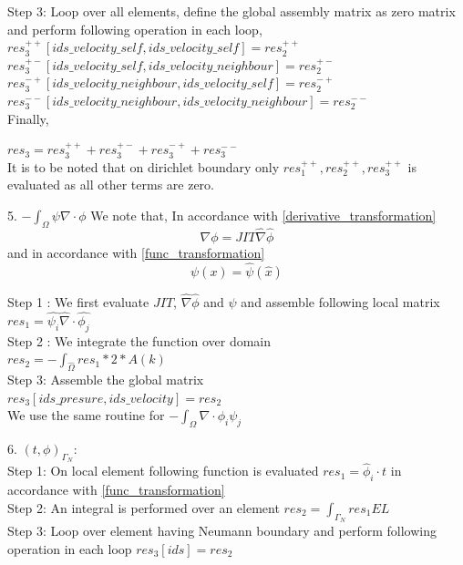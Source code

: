 \documentclass[a4paper,12pt]{book}
\begin{document}
Step 3: Loop over all elements, define the global assembly matrix as zero matrix and perform following operation in each loop,
\\
$res_3^{++}[ids\_velocity\_self,ids\_velocity\_self] = res_2^{++}$\\
$res_3^{+-}[ids\_velocity\_self,ids\_velocity\_neighbour] = res_2^{+-}$\\
$res_3^{-+}[ids\_velocity\_neighbour,ids\_velocity\_self] = res_2^{-+}$\\
$res_3^{--}[ids\_velocity\_neighbour,ids\_velocity\_neighbour] = res_2^{--}$\\

Finally,

$res_3 = res_3^{++} + res_3^{+-} + res_3^{-+} + res_3^{--}$\\

It is to be noted that on dirichlet boundary only $res_1^{++}, res_2^{++}, res_3^{++}$ is evaluated as all other terms are zero.

5. $-\int_{\Omega} \psi \nabla \cdot \phi$
We note that, In accordance with \ref{derivative_transformation}\begin{equation}
\nabla \phi = JIT \hat{\nabla} \hat{\phi}
\end{equation}
and in accordance with \ref{func_transformation}
\begin{equation}
\psi(x) = \hat{\psi} (\hat{x})
\end{equation}

Step 1 : We first evaluate $JIT$, $\hat{\nabla} \hat{\phi}$ and $\psi$ and assemble following local matrix\\
$res_1 = \hat{\psi_i} \hat{\nabla} \cdot \hat{\phi_j}$\\

Step 2 : We integrate the function over domain\\
$res_2 = -\int_{\hat{\Omega}} res_1 * 2 * A(k)$\\

Step 3: Assemble the global matrix\\
$res_3[ids\_presure,ids\_velocity] = res_2$\\

We use the same routine for $-\int_{\Omega} \nabla \cdot \phi_i \psi_j $

6. $(t,\phi)_{\Gamma_N}$:
\\

Step 1: On local element following function is evaluated $res_1=\hat{\phi}_i \cdot t$ in accordance with \ref{func_transformation}\\
Step 2: An integral is performed over an element $res_2=\int_{\Gamma_N} res_1 EL $\\
Step 3: Loop over element having Neumann boundary and perform following operation in each loop $res_3[ids]=res_2$\\
\end{document}
